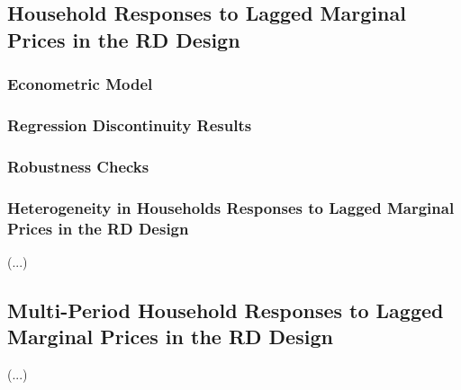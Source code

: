 \subsection{Household Responses to Lagged Marginal Prices in the RD Design}
\label{Sub-Section:Household-Responses-to-Lagged-Marginal-Prices-in-the-RD-Design}

\subsubsection{Econometric Model}
\label{Sub-Sub-Section:Econometric-Model}



\subsubsection{Regression Discontinuity Results}
\label{Sub-Sub-Section:Regression-Discontinuity-Results}



\subsubsection{Robustness Checks}
\label{Sub-Sub-Section:Robustness-Checks}



\subsubsection{Heterogeneity in Households Responses to Lagged Marginal Prices in the RD Design}
\label{Sub-Sub-Section:Heterogeneity-in-Household-Responses-to-Lagged-Marginal-Prices-in-the-RD-Design}
(...)



\subsection{Multi-Period Household Responses to Lagged Marginal Prices in the RD Design}
\label{Sub-Section:Multi-Period-Household-Responses-to-Lagged-Marginal-Prices-in-the-RD-Design}
(...)